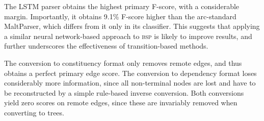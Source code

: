 \documentclass[12pt]{article}
\begin{document}
The LSTM parser obtains the highest primary F-score,
with a considerable margin. Importantly, it obtains 9.1\%
F-score higher than the arc-standard MaltParser, which
differs from it only in its classifier.
This suggests that applying a similar neural network-based approach to
\textsc{bsp} is likely to improve results,
and further underscores the effectiveness of transition-based methods.

The conversion to constituency format only removes remote edges,
and thus obtains a perfect primary edge score.
The conversion to dependency format loses considerably more information, since
all non-terminal nodes are lost and have to be reconstructed by a
simple rule-based inverse conversion. Both conversions yield zero scores on remote edges,
since these are invariably removed when converting to trees.
\end{document}
